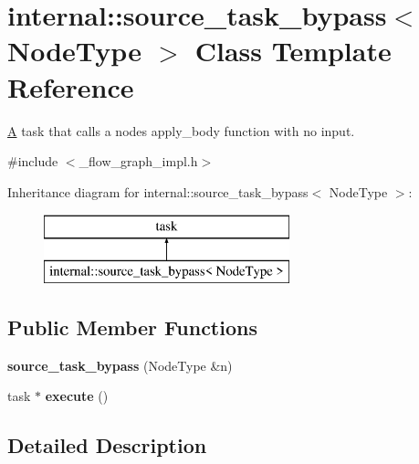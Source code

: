 \hypertarget{classinternal_1_1source__task__bypass}{}\section{internal\+:\+:source\+\_\+task\+\_\+bypass$<$ Node\+Type $>$ Class Template Reference}
\label{classinternal_1_1source__task__bypass}


\hyperlink{structA}{A} task that calls a node\textquotesingle{}s apply\+\_\+body function with no input.  




{\ttfamily \#include $<$\+\_\+flow\+\_\+graph\+\_\+impl.\+h$>$}

Inheritance diagram for internal\+:\+:source\+\_\+task\+\_\+bypass$<$ Node\+Type $>$\+:\begin{figure}[H]
\begin{center}
\leavevmode
\includegraphics[height=2.000000cm]{classinternal_1_1source__task__bypass}
\end{center}
\end{figure}
\subsection*{Public Member Functions}
\begin{DoxyCompactItemize}
\item 
\hypertarget{classinternal_1_1source__task__bypass_a267ffd2a1f1599aca98b6cb43ef59d35}{}{\bfseries source\+\_\+task\+\_\+bypass} (Node\+Type \&n)\label{classinternal_1_1source__task__bypass_a267ffd2a1f1599aca98b6cb43ef59d35}

\item 
\hypertarget{classinternal_1_1source__task__bypass_ac7b73bf1448557daf8f4a79422d8a0a9}{}task $\ast$ {\bfseries execute} ()\label{classinternal_1_1source__task__bypass_ac7b73bf1448557daf8f4a79422d8a0a9}

\end{DoxyCompactItemize}


\subsection{Detailed Description}
